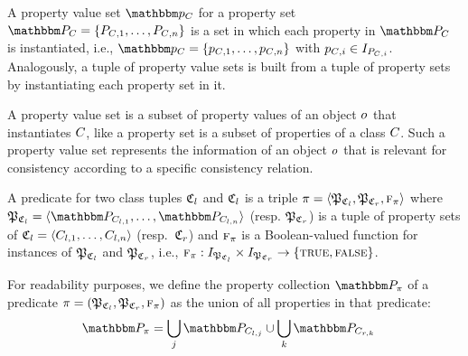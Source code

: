 \begin{definition}
A property value set $\propertyvalueset{p}{\class{C}{}}$ for a property set $\propertyset{P}{\class{C}{}} = \setted{P_{\class{C}{}, 1}, \dots, P_{\class{C}{}, n}}$ is a set in which each property in $\propertyset{P}{\class{C}{}}$ is instantiated, i.e., $\propertyvalueset{p}{\class{C}{}} = \setted{p_{\class{C}{}, 1}, \dots, p_{\class{C}{}, n}}$ with $p_{\class{C}{}, i} \in I_{P_{\class{C}{}, i}}$. 
Analogously, a tuple of property value sets is built from a tuple of property sets by instantiating each property set in it.
\end{definition}

A property value set is a subset of property values of an object $\object{o}{}$ that instantiates $\class{C}{}$, like a property set is a subset of properties of a class $\class{C}{}$. Such a property value set represents the information of an object $\object{o}{}$ that is relevant for consistency according to a specific consistency relation.

\begin{definition}[Predicate]
A predicate for two class tuples $\classtuple{C}{l}$ and $\classtuple{C}{l}$ is a triple $\pi = \tupled{\propertysettuple{P}{\classtuple{C}{l}}, \propertysettuple{P}{\classtuple{C}{r}}, \function{f}_\pi}$ where $\propertysettuple{P}{\classtuple{C}{l}} = \tupled{\propertyset{P}{\class{C}{l,1}}, \dots, \propertyset{P}{\class{C}{l,n}}}$ (resp. $\propertysettuple{P}{\classtuple{C}{r}}$) is a tuple of property sets of $\classtuple{C}{l} = \tupled{\class{C}{l,1}, \dots, \class{C}{l,n}}$ (resp.\ $\classtuple{C}{r}$) and $\textsc{f}_\pi$ is a Boolean-valued function for instances of $\tuple{P}_{\classtuple{C}{l}}$ and $\tuple{P}_{\classtuple{C}{r}}$, i.e., $\function{f}_\pi : \instances{\propertysettuple{P}{\classtuple{C}{l}}} \times \instances{\propertysettuple{P}{\classtuple{C}{r}}} \to \setted{\textsc{true}, \textsc{false}}$.
\end{definition}

For readability purposes, we define the property collection $\propertycollection{\pi}$ of a predicate $\pi = (\propertysettuple{P}{\classtuple{C}{l}}, \propertysettuple{P}{\classtuple{C}{r}}, \function{f}_\pi)$ as the union of all properties in that predicate:
\begin{align*}
    &
    \propertycollection{\pi} = \bigcup_{j} \propertyset{P}{\class{C}{l,j}} \cup \bigcup_{k} \propertyset{P}{\class{C}{r,k}}
\end{align*}

